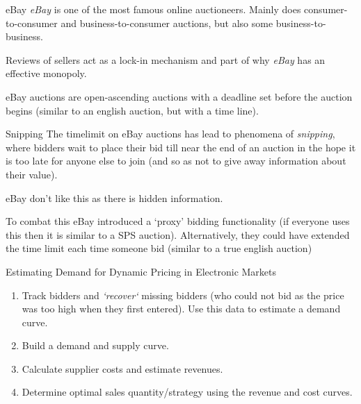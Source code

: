 \documentclass[11pt,a4paper]{article}
\begin{document}
  \begin{remark}{eBay}
    \textit{eBay} is one of the most famous online auctioneers. Mainly does consumer-to-consumer and business-to-consumer auctions, but also some business-to-business.
    \par Reviews of sellers act as a lock-in mechanism and part of why \textit{eBay} has an effective monopoly.
    \par eBay auctions are open-ascending auctions with a deadline set before the auction begins (similar to an english auction, but with a time line).
  \end{remark}

  \begin{remark}{Snipping}
    The timelimit on eBay auctions has lead to phenomena of \textit{snipping}, where bidders wait to place their bid till near the end of an auction in the hope it is too late for anyone else to join (and so as not to give away information about their value).
    \par eBay don't like this as there is hidden information.
    \par To combat this eBay introduced a `proxy' bidding functionality (if everyone uses this then it is similar to a SPS auction). Alternatively, they could have extended the time limit each time someone bid (similar to a true english auction)
  \end{remark}

  \begin{proposition}{Estimating Demand for Dynamic Pricing in Electronic Markets}
    \begin{enumerate}
      \item Track bidders and \textit{`recover`} missing bidders (who could not bid as the price was too high when they first entered). Use this data to estimate a demand curve.
      \item Build a demand and supply curve.
      \item Calculate supplier costs and estimate revenues.
      \item Determine optimal sales quantity/strategy using the revenue and cost curves.
    \end{enumerate}
  \end{proposition}
\end{document}
